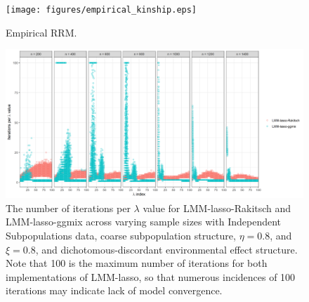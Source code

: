 \begin{figure}[H]
    \centering
    \texttt{[image: figures/empirical\_kinship.eps]}
    \caption{Empirical RRM.}
    \label{fig:empirical}
\end{figure}


\begin{figure}
    \centering
    \includegraphics[width=\textwidth, height=\textheight, keepaspectratio]{figures/niter_perLambda_point.png}
    \caption{The number of iterations per $\lambda$ value for LMM-lasso-Rakitsch and LMM-lasso-ggmix across varying sample sizes with Independent Subpopulations data, coarse subpopulation structure, $\eta = 0.8$, and $\xi = 0.8$, and dichotomous-discordant environmental effect structure. Note that 100 is the maximum number of iterations for both implementations of LMM-lasso, so that numerous incidences of 100 iterations may indicate lack of model convergence.}
    \label{fig:niter}
\end{figure}
